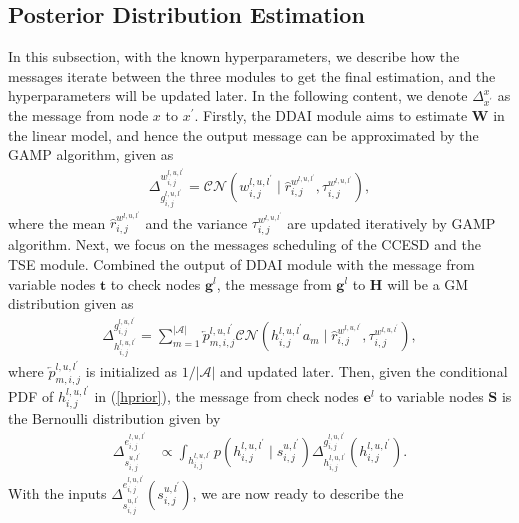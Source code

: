 \documentclass[conference]{IEEEtran}
\begin{document}
	\subsection{Posterior Distribution Estimation}
	In this subsection, with the known hyperparameters, we describe how the messages iterate between the three modules to get the final estimation, and the hyperparameters will be updated later. In the following content, we denote $\Delta^x_{x^{\prime}}$ as the message from node $x$ to $x^{\prime}$. Firstly, the DDAI module aims to estimate $\mathbf W$ in the linear model, and hence the output message can be approximated by the GAMP algorithm\cite{sss}, given as
	\begin{align}
	\label{gampout}
	\Delta_{g_{i,j}^{l,u,l^{\prime}}}^{w_{i,j}^{l,u,l^{\prime}}}
	=\mathcal{CN}(w_{i,j}^{l,u,l^{\prime}}\mid\hat{r}_{i,j}^{w^{l,u,l^{\prime}}}, \tau_{i,j}^{w^{l,u,l^{\prime}}}),
	\end{align}
 where the mean $\hat{r}_{i,j}^{w^{l,u,l^{\prime}}}$ and the variance $\tau_{i,j}^{w^{l,u,l^{\prime}}}$ are updated iteratively by GAMP algorithm. 
 Next, we focus on the messages scheduling of the CCESD and the TSE module.
	Combined the output of DDAI module with the message from variable nodes $\mathbf t$ to check nodes ${\mathbf g^l}$, the message from ${\mathbf g^l}$ to $\mathbf H$ will be a GM distribution given as
	\begin{align}
	\label{CCESDfirst}
		\Delta^{g_{i,j}^{l,u,l^{\prime}}}_{h_{i,j}^{l,u,l^{\prime}}}
		=\sum_{m=1}^{|\mathcal A|} \overleftarrow{p}^{l,u,l^{\prime}}_{m,i,j} \mathcal{CN}(h_{i,j}^{l,u,l^{\prime}}a_m\mid \hat{r}_{i,j}^{w^{l,u,l^{\prime}}}, \tau_{i,j}^{w^{l,u,l^{\prime}}}), 
	\end{align}
	where $\overleftarrow{p}^{l,u,l^{\prime}}_{m,i,j}$ is initialized as $1/|\mathcal A|$ and updated later. Then, given the conditional PDF of $h_{i,j}^{l,u,l^{\prime}}$ in (\ref{hprior}), the message from check nodes $\mathbf e^l$ to variable nodes $\mathbf S$ is the Bernoulli distribution given by
	\begin{align}
	\label{initialS}
		\Delta^{e_{i,j}^{l,u,l^{\prime}}}_{s_{i,j}^{u,l^{\prime}}}
		&\propto \int_{h_{i, j}^{l, u, l^{\prime}}}
		p\left(h_{i, j}^{l, u, l^{\prime}} \mid s_{i, j}^{u, l^{\prime}} \right) \Delta^{g_{i,j}^{l,u,l^{\prime}}}_{h_{i,j}^{l,u,l^{\prime}}}(h_{i,j}^{l,u,l^{\prime}}). 
	\end{align}
    With the inputs $\Delta^{e_{i,j}^{l,u,l^{\prime}}}_{s_{i,j}^{u,l^{\prime}}}(s_{i,j}^{u,l^{\prime}})$, we are now ready to describe the
\end{document}
